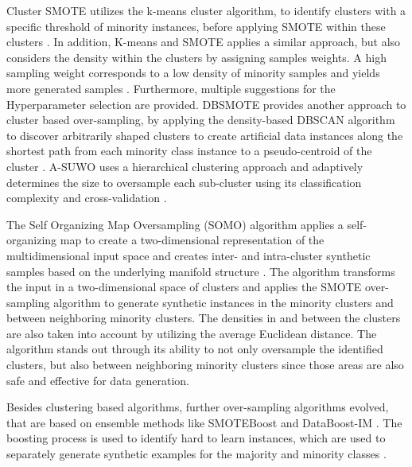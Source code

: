 \documentclass[parskip=full]{scrartcl}
\begin{document}
Cluster SMOTE utilizes the k-means cluster algorithm, to identify clusters with a specific threshold of minority instances, before applying SMOTE within these clusters \cite{CieslakCS06}. In addition, K-means and SMOTE applies a similar approach, but also considers the density within the clusters by assigning samples weights. A high sampling weight corresponds to a low density of minority samples and yields more generated samples \cite{Last2017}. Furthermore, multiple suggestions for the Hyperparameter selection are provided. DBSMOTE provides another approach to cluster based over-sampling, by applying the density-based DBSCAN algorithm to discover arbitrarily shaped clusters to create artificial data instances along the shortest path from each minority class instance to a pseudo-centroid of the cluster \cite{Bunkhumpornpat2011}. A-SUWO uses a hierarchical clustering approach and adaptively determines the size to oversample each sub-cluster using its classification complexity and cross-validation \cite{Nekooeimehr2015}. 

The Self Organizing Map Oversampling (SOMO) algorithm applies a self-organizing map to create a two-dimensional representation of the multidimensional input space and creates inter- and intra-cluster synthetic samples based on the underlying manifold structure \cite{Douzas2017B}. The algorithm transforms the input in a two-dimensional space of clusters and applies the SMOTE over-sampling algorithm to generate synthetic instances in the minority clusters and between neighboring minority clusters. The densities in and between the clusters are also taken into account by utilizing the average Euclidean distance. The algorithm stands out through its ability to not only oversample the identified clusters, but also between neighboring minority clusters since those areas are also safe and effective for data generation.  

Besides clustering based algorithms, further over-sampling algorithms evolved, that are based on ensemble methods like SMOTEBoost \cite{Chawla2003} and DataBoost-IM \cite{Guo2004}. The boosting process is used to identify hard to learn instances, which are used to separately generate synthetic examples for the majority and minority classes  \cite{Guo2004}. 



\end{document}
